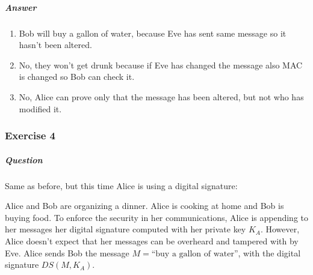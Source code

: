 \documentclass{article}
\begin{document}
                                \subparagraph{Answer}
                                \begin{enumerate}
                                    \item Bob will buy a gallon of water, because Eve has sent same message so it hasn't been altered.
                                    \item No, they won't get drunk because if Eve has changed the message also MAC is changed so Bob can check it.
                                    \item No, Alice can prove only that the message has been altered, but not who has modified it.  
                                \end{enumerate}
                            \subsubsection{Exercise 4}
                                \subparagraph{Question}
                                Same as before, but this time Alice is using a digital signature:

                                Alice and Bob are organizing a dinner. Alice is cooking at home and Bob is buying food. To enforce the security in her communications, Alice is appending to her messages her digital signature computed with her private key \( K_A \).
                                However, Alice doesn’t expect that her messages can be overheard and tampered with by Eve.
                                Alice sends Bob the message \( M = \text{``buy a gallon of water''} \), with the digital signature \( DS(M,K_A) \).
                                
\end{document}
